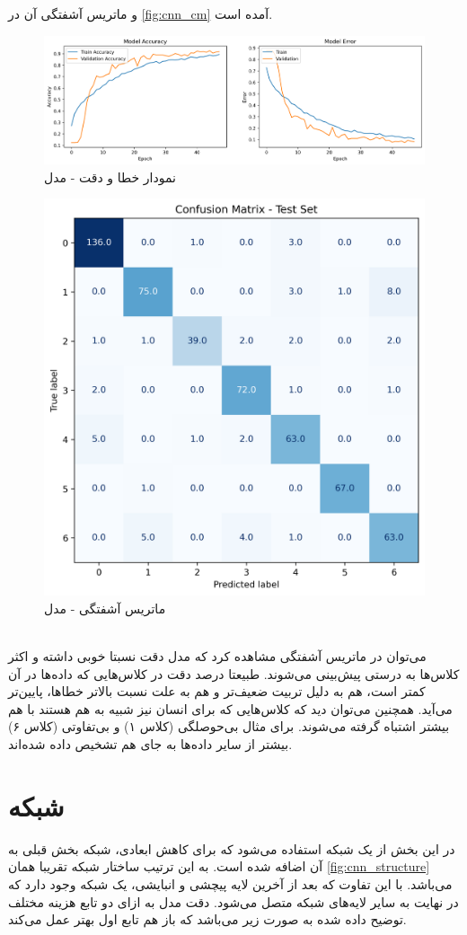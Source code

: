 \documentclass[11pt]{article}
\begin{document}
و ماتریس آشفتگی آن در 
	\autoref{fig:cnn_cm}
	آمده است.
		\begin{figure}[!h]
		\centerline{\includegraphics[width=1\linewidth]{../EMO_cnn_loss1.png}}
		\caption{نمودار خطا و دقت  -  مدل }
		\label{fig:cnn_loss1}
	\end{figure}
	\begin{figure}[!h]
		\centerline{\includegraphics[width=0.7\linewidth]{../cnn_loss1_cm.png}}
		\caption{ماتریس آشفتگی - مدل }
		\label{fig:cnn_cm} 
	\end{figure}\\
	می‌توان در ماتریس آشفتگی مشاهده‌ کرد که مدل دقت نسبتا خوبی داشته و اکثر کلاس‌ها به درستی پیش‌بینی می‌شوند. طبیعتا درصد دقت در کلاس‌هایی که داده‌ها در آن کمتر است، هم به دلیل تربیت ضعیف‌تر و هم به علت نسبت بالاتر خطا‌ها، پایین‌تر می‌آید. همچنین می‌توان دید که کلاس‌هایی که برای انسان نیز شبیه به هم هستند با هم بیشتر اشتباه گرفته می‌شوند. برای مثال بی‌حوصلگی (کلاس ۱) و بی‌تفاوتی (کلاس ۶) بیشتر از سایر داده‌ها به جای هم تشخیص داده شده‌اند.
	\clearpage
	\section{شبکه }
	در این بخش از یک شبکه  استفاده می‌شود که برای کاهش ابعادی، شبکه  بخش قبلی به آن اضافه شده است. به این ترتیب ساختار شبکه تقریبا همان 
	\autoref{fig:cnn_structure}
	می‌باشد. با این تفاوت که بعد از آخرین لایه پیچشی و انبایشی،‌ یک شبکه  وجود دارد که در نهایت به سایر لایه‌های شبکه متصل می‌شود. دقت مدل به ازای دو تابع هزینه مختلف توضیح داده شده به صورت زیر می‌باشد که باز هم تابع اول بهتر عمل می‌کند.
	  
\end{document}
